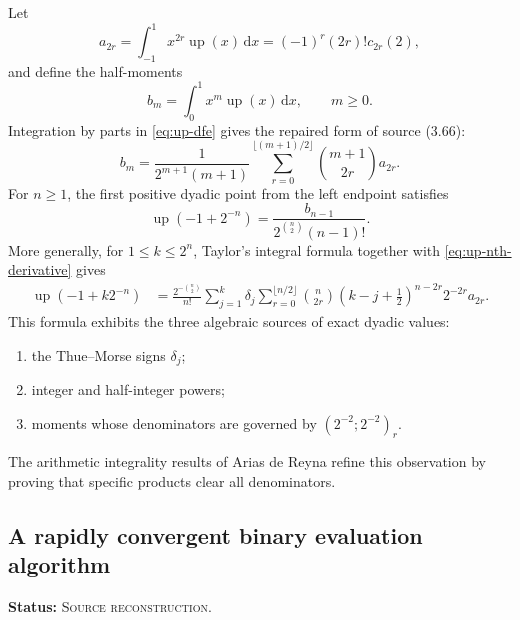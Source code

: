 \documentclass[11pt]{article}
\theoremstyle{definition}
\theoremstyle{remark}
\newcommand{\Up}{\operatorname{up}}
\newcommand{\dd}{\,\mathrm{d}}
\newcommand{\SourceStatus}{\textcolor{SourceBlue}{\textsc{Source reconstruction}}}
\newcommand{\status}[1]{\par\smallskip\noindent\textbf{Status:} #1.\par\smallskip}
\begin{document}
Let
\begin{equation}
  a_{2r}=\int_{-1}^{1}x^{2r}\Up(x)\dd x
  =(-1)^r(2r)!c_{2r}(2),
  \label{eq:up-even-moments}
\end{equation}
and define the half-moments
\begin{equation}
  b_m=\int_{0}^{1}x^m\Up(x)\dd x,
  \qquad m\ge0.
  \label{eq:b-moments}
\end{equation}
Integration by parts in \eqref{eq:up-dfe} gives the repaired form of source (3.66):
\begin{equation}
  b_m=\frac{1}{2^{m+1}(m+1)}
  \sum_{r=0}^{\lfloor(m+1)/2\rfloor}
     \binom{m+1}{2r}a_{2r}.
  \label{eq:b-from-a}
\end{equation}
For \(n\ge1\), the first positive dyadic point from the left endpoint satisfies
\begin{equation}
  \Up(-1+2^{-n})
    =\frac{b_{n-1}}{2^{\binom n2}(n-1)!}.
  \label{eq:first-dyadic-value}
\end{equation}
More generally, for \(1\le k\le2^n\), Taylor's integral formula together with \eqref{eq:up-nth-derivative} gives
\begin{align}
 \Up(-1+k2^{-n})
 &=\frac{2^{-\binom n2}}{n!}
 \sum_{j=1}^{k}\delta_j
 \sum_{r=0}^{\lfloor n/2\rfloor}
   \binom n{2r}
   \left(k-j+\frac12\right)^{n-2r}
   2^{-2r}a_{2r}.
 \label{eq:all-dyadic-values}
\end{align}
This formula exhibits the three algebraic sources of exact dyadic values:
\begin{enumerate}
  \item the Thue--Morse signs \(\delta_j\);
  \item integer and half-integer powers;
  \item moments whose denominators are governed by \((2^{-2};2^{-2})_r\).
\end{enumerate}
The arithmetic integrality results of Arias de Reyna refine this observation by proving that specific products clear all denominators.

\subsection{A rapidly convergent binary evaluation algorithm}
\status{\SourceStatus}
\end{document}
